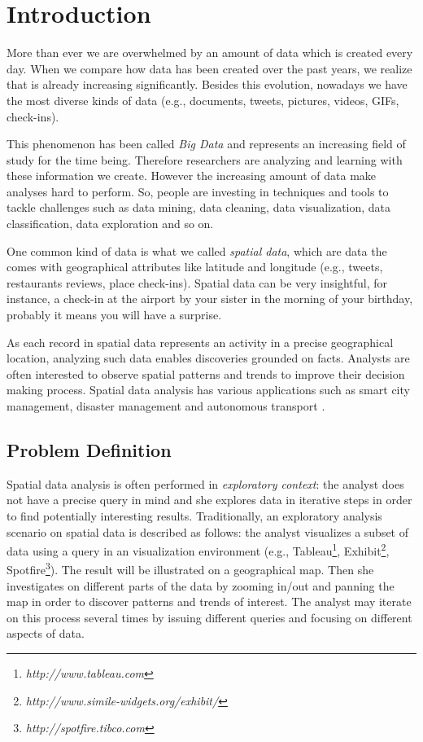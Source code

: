 \chapter{Introduction}
\label{chap:intro}

More than ever we are overwhelmed by an amount of data which is created every day. When we compare how data has been created over the past years, we realize that is already increasing significantly. Besides this evolution, nowadays we have the most diverse kinds of data (e.g., documents, tweets, pictures, videos, GIFs, check-ins).

This phenomenon has been called \textit{Big Data} and represents an increasing field of study for the time being. Therefore researchers are analyzing and learning with these information we create. However the increasing amount of data make analyses hard to perform. So, people are investing in techniques and tools to tackle challenges such as data mining, data cleaning, data visualization, data classification, data exploration and so on.

One common kind of data is what we called {\em spatial data}, which are data the comes with geographical attributes like latitude and longitude (e.g., tweets, restaurants reviews, place check-ins). Spatial data can be very insightful, for instance, a check-in at the airport by your sister in the morning of your birthday, probably it means you will have a surprise.

As each record in spatial data represents an activity in a precise geographical location, analyzing such data enables discoveries grounded on facts. Analysts are often interested to observe spatial patterns and trends to improve their decision making process. Spatial data analysis has various applications such as smart city management, disaster management and autonomous transport \cite{RoddickEHPS04,Telang:2012}.

\section{Problem Definition}

Spatial data analysis is often performed in {\em exploratory context}: the analyst does not have a precise query in mind and she explores data in iterative steps in order to find potentially interesting results. Traditionally, an exploratory analysis scenario on spatial data is described as follows: the analyst visualizes a subset of data using a query in an visualization environment (e.g., Tableau\footnote{\it http://www.tableau.com},
Exhibit\footnote{\it http://www.simile-widgets.org/exhibit/},
Spotfire\footnote{\it http://spotfire.tibco.com}). The result will be illustrated on a geographical map. Then she investigates on different parts of the data by zooming in/out and panning the map in order to discover patterns and trends of interest. The analyst may iterate on this process several times by issuing different queries and focusing on different aspects of data.

